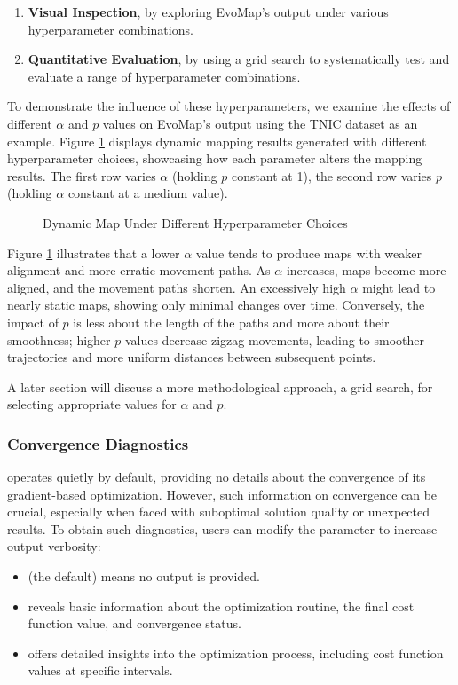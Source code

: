 \documentclass[article]{jss}
\begin{document}
\begin{enumerate}
  \item \textbf{Visual Inspection}, by exploring EvoMap's output under various hyperparameter combinations. 
  \item \textbf{Quantitative Evaluation}, by using a grid search to systematically test and evaluate a range of %
  hyperparameter combinations.
\end{enumerate}

To demonstrate the influence of these hyperparameters, we examine the effects of different $\alpha$ and $p$ 
values on EvoMap's output using the TNIC dataset as an example. Figure \ref{fig:hyperparameters} displays 
dynamic mapping results generated with different hyperparameter choices, showcasing how each parameter alters the mapping 
results. The first row varies $\alpha$ (holding $p$ constant at 1), the second row varies $p$ (holding $\alpha$ constant
at a medium value).

\begin{figure}[hbt!]
  \centering
  \caption{\label{fig:hyperparameters} Dynamic Map Under Different Hyperparameter Choices}
\end{figure}
  
Figure \ref{fig:hyperparameters} illustrates that a lower $\alpha$ value tends to produce maps with weaker alignment 
and more erratic movement paths. As $\alpha$ increases, maps become more aligned, and the movement paths shorten. 
An excessively high $\alpha$ might lead to nearly static maps, showing only minimal changes over time. 
Conversely, the impact of $p$ is less about the length of the paths and more about their smoothness; higher $p$ values 
decrease zigzag movements, leading to smoother trajectories and more uniform distances between subsequent points.

A later section will discuss a more methodological approach, a grid search, for selecting appropriate 
values for $\alpha$ and $p$.

\subsubsection{Convergence Diagnostics}

 operates quietly by default, providing no details about the convergence
of its gradient-based optimization. However, such information on convergence can be crucial, 
especially when faced with suboptimal solution quality or unexpected results. 
To obtain such diagnostics, users can modify the  parameter to increase output verbosity: 
\begin{itemize}
  \item {} (the default) means no output is provided.
  \item {} reveals basic information about the optimization routine, the final cost function value, and %
  convergence status.
  \item {} offers detailed insights into the optimization process, including cost function values at %
  specific intervals.  
\end{itemize}
\end{document}
